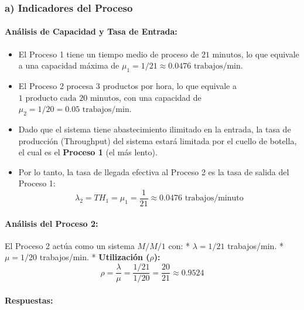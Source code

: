 \documentclass[
]{article}
\providecommand{\tightlist}{%
  \setlength{\itemsep}{0pt}\setlength{\parskip}{0pt}}
\begin{document}
\hypertarget{a-indicadores-del-proceso}{%
\subsubsection{a) Indicadores del
Proceso}\label{a-indicadores-del-proceso}}

\hypertarget{anuxe1lisis-de-capacidad-y-tasa-de-entrada}{%
\paragraph{Análisis de Capacidad y Tasa de
Entrada:}\label{anuxe1lisis-de-capacidad-y-tasa-de-entrada}}

\begin{itemize}
\tightlist
\item
  El Proceso 1 tiene un tiempo medio de proceso de
  \(21\text{ minutos}\), lo que equivale a una capacidad máxima de
  \(\mu_1 = 1 / 21 \approx 0.0476\text{ trabajos/min}\).
\item
  El Proceso 2 procesa 3 productos por hora, lo que equivale a
  \(1\text{ producto cada 20 minutos}\), con una capacidad de
  \(\mu_2 = 1 / 20 = 0.05\text{ trabajos/min}\).
\item
  Dado que el sistema tiene abastecimiento ilimitado en la entrada, la
  tasa de producción (Throughput) del sistema estará limitada por el
  cuello de botella, el cual es el \textbf{Proceso 1} (el más lento).
\item
  Por lo tanto, la tasa de llegada efectiva al Proceso 2 es la tasa de
  salida del Proceso 1:
  \[\lambda_2 = TH_1 = \mu_1 = \frac{1}{21} \approx 0.0476 \text{ trabajos/minuto}\]
\end{itemize}

\hypertarget{anuxe1lisis-del-proceso-2}{%
\paragraph{Análisis del Proceso 2:}\label{anuxe1lisis-del-proceso-2}}

El Proceso 2 actúa como un sistema \(M/M/1\) con: * \(\lambda = 1/21\)
trabajos/min. * \(\mu = 1/20\) trabajos/min. * \textbf{Utilización
(\(\rho\)):}
\[\rho = \frac{\lambda}{\mu} = \frac{1/21}{1/20} = \frac{20}{21} \approx 0.9524\]

\hypertarget{respuestas-1}{%
\paragraph{Respuestas:}\label{respuestas-1}}
\end{document}
